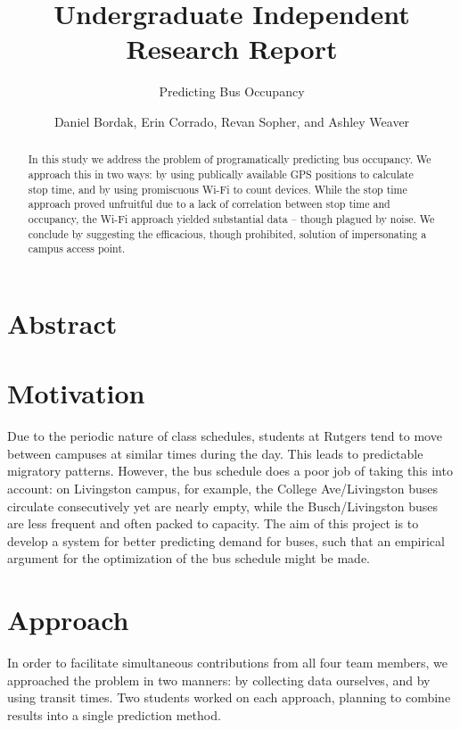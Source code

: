 \documentclass[letterpaper]{scrartcl}
\begin{document}
\title{Undergraduate Independent Research Report}
\subtitle{Predicting Bus Occupancy}
\author{Daniel Bordak, Erin Corrado, Revan Sopher, and Ashley Weaver}

\maketitle

\section*{Abstract}
\begin{abstract}
In this study we address the problem of programatically predicting bus occupancy.
We approach this in two ways: by using publically available GPS positions to calculate stop time, and by using promiscuous Wi-Fi to count devices.
While the stop time approach proved unfruitful due to a lack of correlation between stop time and occupancy, the Wi-Fi approach yielded substantial data -- though plagued by noise. We conclude by suggesting the efficacious, though prohibited, solution of impersonating a campus access point.
\end{abstract}

\section*{Motivation}

Due to the periodic nature of class schedules, students at Rutgers tend to move between campuses at similar times during the day.
This leads to predictable migratory patterns. However, the bus schedule does a poor job of taking this into account: on Livingston campus, for example, the College Ave/Livingston buses circulate consecutively yet are nearly empty, while the Busch/Livingston buses are less frequent and often packed to capacity.
The aim of this project is to develop a system for better predicting demand for buses, such that an empirical argument for the optimization of the bus schedule might be made.

\section*{Approach}

In order to facilitate simultaneous contributions from all four team members, we approached the problem in two manners: by collecting data ourselves, and by using transit times.
Two students worked on each approach, planning to combine results into a single prediction method.
\end{document}
